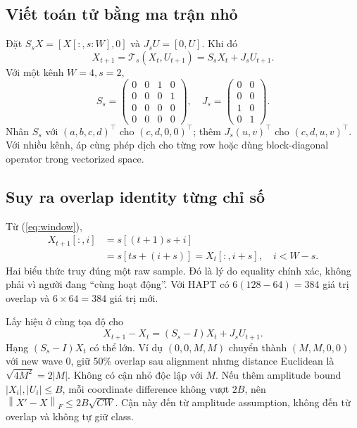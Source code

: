 \documentclass[11pt,a4paper]{article}
\newcommand{\norm}[1]{\left\lVert#1\right\rVert}
\theoremstyle{definition}
\begin{document}
\subsection{Viết toán tử bằng ma trận nhỏ}
Đặt $S_sX=[X[:,s:W],0]$ và $J_sU=[0,U]$. Khi đó
\begin{equation}
X_{t+1}=\mathcal T_s(X_t,U_{t+1})=S_sX_t+J_sU_{t+1}.
\end{equation}
Với một kênh $W=4,s=2$,
\begin{equation}
S_s=\begin{pmatrix}0&0&1&0\\0&0&0&1\\0&0&0&0\\0&0&0&0\end{pmatrix},\quad
J_s=\begin{pmatrix}0&0\\0&0\\1&0\\0&1\end{pmatrix}.
\end{equation}
Nhân $S_s$ với $(a,b,c,d)^\top$ cho $(c,d,0,0)^\top$; thêm
$J_s(u,v)^\top$ cho $(c,d,u,v)^\top$. Với nhiều kênh, áp cùng phép dịch
cho từng row hoặc dùng block-diagonal operator trong vectorized space.

\subsection{Suy ra overlap identity từng chỉ số}
Từ (\ref{eq:window}),
\begin{align}
X_{t+1}[:,i]&=s[(t+1)s+i]\\
&=s[ts+(i+s)]=X_t[:,i+s],\quad i<W-s.
\end{align}
Hai biểu thức truy đúng một raw sample. Đó là lý do equality chính xác,
không phải vì người đang ``cùng hoạt động''. Với HAPT có $6(128-64)=384$
giá trị overlap và $6\times64=384$ giá trị mới.

Lấy hiệu ở cùng tọa độ cho
\begin{equation}
X_{t+1}-X_t=(S_s-I)X_t+J_sU_{t+1}.
\end{equation}
Hạng $(S_s-I)X_t$ có thể lớn. Ví dụ $(0,0,M,M)$ chuyển thành
$(M,M,0,0)$ với new wave 0, giữ 50\% overlap sau alignment nhưng distance
Euclidean là $\sqrt{4M^2}=2|M|$. Không có cận nhỏ độc lập với $M$.
Nếu thêm amplitude bound $|X_i|,|U_i|\le B$, mỗi coordinate difference
không vượt $2B$, nên $\norm{X'-X}_F\le2B\sqrt{CW}$. Cận này đến từ
amplitude assumption, không đến từ overlap và không tự giữ class.
\end{document}
